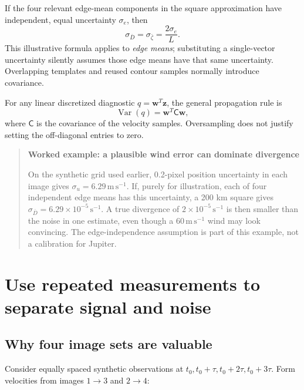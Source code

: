 \documentclass[11pt]{article}
\newcommand{\Var}{\operatorname{Var}}
\newcommand{\ms}{\mathrm{m\,s^{-1}}}
\newcommand{\sone}{\mathrm{s^{-1}}}
\newenvironment{teaching}[1]{\begin{quote}\small\textbf{#1}\par}{\end{quote}}
\begin{document}
If the four relevant edge-mean components in the square approximation have
independent, equal uncertainty $\sigma_e$, then
\begin{equation}\label{eq:toyerror}
 \sigma_{\bar D}=\sigma_{\bar\zeta}=\frac{2\sigma_e}{L}.
\end{equation}
This illustrative formula applies to \emph{edge means}; substituting a
single-vector uncertainty silently assumes those edge means have that same
uncertainty. Overlapping templates and reused contour samples normally
introduce covariance.

For any linear discretized diagnostic $q=\bm{w}^{T}\bm{z}$, the general
propagation rule is
\begin{equation}
 \Var(q)=\bm{w}^{T}\mathsf{C}\bm{w},
\end{equation}
where $\mathsf{C}$ is the covariance of the velocity samples. Oversampling
does not justify setting the off-diagonal entries to zero.

\begin{teaching}{Worked example: a plausible wind error can dominate divergence}
On the synthetic grid used earlier, 0.2-pixel position uncertainty in each
image gives $\sigma_u=6.29\,\ms$. If, purely for illustration, each of four
independent edge means has this uncertainty, a 200 km square gives
$\sigma_{\bar D}=6.29\times10^{-5}\,\sone$. A true divergence of
$2\times10^{-5}\,\sone$ is then smaller than the noise in one estimate,
even though a $60\,\ms$ wind may look convincing. The edge-independence
assumption is part of this example, not a calibration for Jupiter.
\end{teaching}

\section{Use repeated measurements to separate signal and noise}

\subsection{Why four image sets are valuable}

Consider equally spaced synthetic observations at $t_0,t_0+\tau,
t_0+2\tau,t_0+3\tau$. Form velocities from images $1\to3$ and $2\to4$:

\begin{center}
\end{center}
\end{document}
